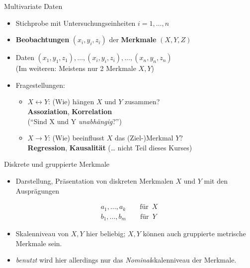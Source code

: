 \documentclass[
  10pt,
  ignorenonframetext,
]{beamer}
\providecommand{\tightlist}{%
  \setlength{\itemsep}{0pt}\setlength{\parskip}{0pt}}
\begin{document}
\begin{frame}{Multivariate Daten}
\protect\hypertarget{multivariate-daten}{}
\begin{itemize}
\tightlist
\item
  Stichprobe mit Untersuchungseinheiten \(i = 1, \dots, n\)
\item
  \textbf{Beobachtungen} \((x_i,y_i,z_i)\) der \textbf{Merkmale}
  \((X,Y,Z)\)
\item
  Daten \((x_1,y_1,z_1),\ldots,(x_i,y_i,z_i),\ldots,(x_n,y_n,z_n)\)\\
  (Im weiteren: Meistens nur 2 Merkmale \(X, Y\))
\item
  Fragestellungen:

  \begin{itemize}
  \tightlist
  \item
    \(X \leftrightarrow Y\): (Wie) hängen \(X\) und \(Y\) zusammen?\\
    \textbf{Assoziation}, \textbf{Korrelation}\\
    (``Sind X und Y \emph{unabhängig}?'')
  \item
    \(X \rightarrow Y\): (Wie) beeinflusst \(X\) das (Ziel-)Merkmal
    \(Y\)?\\
    \textbf{Regression}, \textbf{Kausalität} (\ldots{} nicht Teil dieses
    Kurses)
  \end{itemize}
\end{itemize}
\end{frame}

\begin{frame}{Diskrete und gruppierte Merkmale}
\protect\hypertarget{diskrete-und-gruppierte-merkmale}{}
\begin{itemize}
\tightlist
\item
  Darstellung, Präsentation von diskreten Merkmalen \(X\) und \(Y\) mit
  den Ausprägungen
\end{itemize}

\begin{equation*}
\begin{array}{c}
a_1,\ldots,a_k \qquad \mbox{für }\,X\\
b_1,\ldots,b_m \qquad \mbox{für }\,Y
\end{array}
\end{equation*}

\begin{itemize}
\tightlist
\item
  Skalenniveau von \(X, Y\) hier beliebig; \(X, Y\) können auch
  gruppierte metrische Merkmale sein.
\item
  \emph{benutzt} wird hier allerdings nur das \emph{Nominal}skalenniveau
  der Merkmale.
\end{itemize}
\end{frame}
\end{document}
